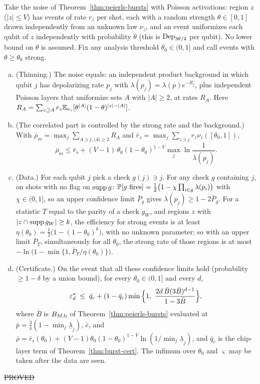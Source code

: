 \begin{theorem}\label{thm:weak-bursts}
Take the noise of Theorem~\ref{thm:peierls-bursts} with Poisson activations: region $z$ ($|z|\le V$) has events of rate $r_z$ per shot, each with a random strength $\theta\in[0,1]$ drawn independently from an unknown law $\nu_z$, and an event uniformizes each qubit of $z$ independently with probability $\theta$ (this is $\mathrm{Dep}_{3\theta/4}$ per qubit). No lower bound on $\theta$ is assumed. Fix any analysis threshold $\theta_0\in(0,1]$ and call events with $\theta\ge\theta_0$ strong.
\begin{enumerate}[(a)]
\item (Thinning.) The noise equals: an independent product background in which qubit $j$ has depolarizing rate $p_j$ with $\lambda(p_j)=\lambda(p)e^{-R_j}$, plus independent Poisson layers that uniformize sets $A$ with $|A|\ge2$, at rates $R_A$. Here $R_A=\sum_{z\supseteq A}r_z\mathbb{E}_{\nu_z}[\theta^{|A|}(1-\theta)^{|z|-|A|}]$.
\item (The correlated part is controlled by the strong rate and the background.) With $\bar\rho_m=\max_j\sum_{A\ni j,|A|\ge2}R_A$ and $\bar r_s=\max_j\sum_{z\ni j}r_z\nu_z([\theta_0,1])$,
\[
\bar\rho_m\le\bar r_s+(V-1)\,\theta_0(1-\theta_0)^{1-V}\max_j\ln\frac1{\lambda(p_j)}.
\]
\item (Data.) For each qubit $j$ pick a check $g(j)\ni j$. For any check $g$ containing $j$, on shots with no flag on $\operatorname{supp} g$: $\mathbb{P}[\text{$g$ fires}]=\tfrac12\big(1-\chi\prod_{i\in g}\lambda(p_i)\big)$ with $\chi\in(0,1]$, so an upper confidence limit $\bar P_g$ gives $\lambda(p_j)\ge1-2\bar P_g$. For a statistic $T$ equal to the parity of a check $g_W$, and regions $z$ with $|z\cap\operatorname{supp} g_W|\ge k$, the efficiency for strong events is at least $\eta(\theta_0)=\tfrac12\big(1-(1-\theta_0)^k\big)$, with no unknown parameter; so with an upper limit $\bar P_T$, simultaneously for all $\theta_0$, the strong rate of those regions is at most $-\ln\big(1-\min\{1,\bar P_T/\eta(\theta_0)\}\big)$.
\item (Certificate.) On the event that all these confidence limits hold (probability $\ge1-\delta$ by a union bound), for every $\theta_0\in(0,1]$ and every $d$,
\[
\varepsilon^{\star}_d\;\le\;\bar q_c+(1-\bar q_c)\min\Big\{1,\ \frac{2d\,\bar B(3\bar B)^{d-1}}{1-3\bar B}\Big\},
\]
where $\bar B$ is $B_{M,\rm b}$ of Theorem~\ref{thm:peierls-bursts} evaluated at $\bar p=\tfrac34(1-\min_j\underline\lambda_j)$, $\bar e$, and $\bar\rho=\bar r_s(\theta_0)+(V-1)\theta_0(1-\theta_0)^{1-V}\ln(1/\min_j\underline\lambda_j)$, and $\bar q_c$ is the chip-layer term of Theorem~\ref{thm:burst-cert}. The infimum over $\theta_0$ and $\varsigma$ may be taken after the data are seen.
\end{enumerate}
\hfill\st{PROVED}
\end{theorem}
